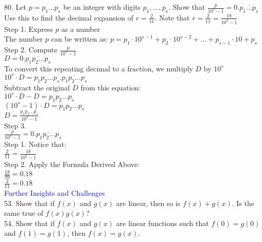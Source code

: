 \documentclass{article}
\begin{document}
80. Let $p = p_1 \dots p_s$ be an integer with digits $p_1, \dots, p_s$. Show that $\frac{p}{10^s - 1} = 0.\overline{p_1 \dots p_s}$ Use this to find the decimal expansion of $r = \frac{2}{11}$. Note that $r = \frac{2}{11} = \frac{18}{10^2 - 1}$\\

Step 1. Express $p$ as a number\\
The number $p$ can be written as: $p = p_1 \cdot 10^{s-1} + p_2 \cdot 10^{s-2} + \dots + p_{s-1} \cdot 10 + p_s$\\

Step 2. Compute $\frac{p}{10^{s}-1}$\\
$D = 0.\overline{p_1p_2\dots p_s}$\\

To convert this repeating decimal to a fraction, we multiply $D$ by $10^s$\\
$10^s \cdot D = p_1p_2\dots p_s.\overline{p_1p_2\dots p_s}$\\

Subtract the original $D$ from this equation:\\
$10^s \cdot D - D = p_1p_2\dots p_s$\\

$(10^s - 1) \cdot D = p_1p_2\dots p_s$\\

$D = \frac{p_1p_2\dots p_s}{10^s - 1}$\\

Step 3.\\
$\frac{p}{10^s - 1} = 0.\overline{p_1p_2\dots p_s}$\\

Step 1. Notice that:\\
$\frac{2}{11} = \frac{18}{10^{2} - 1}$\\

Step 2. Apply the Formula Derived Above:\\
$\frac{18}{99} = 0.\overline{18}$\\
$\frac{2}{11} = 0.\overline{18}$\\


\textcolor{blue}{Further Insights and Challenges} \\

53. Show that if $f(x)$ and $g(x)$ are linear, then so is $f(x) + g(x)$. Is the same true of $f(x)g(x)$?\\

54. Show that if $f(x)$ and $g(x)$ are linear functions such that $f(0) = g(0)$ and $f(1) = g(1)$, then $f(x) = g(x)$.\\
\end{document}
